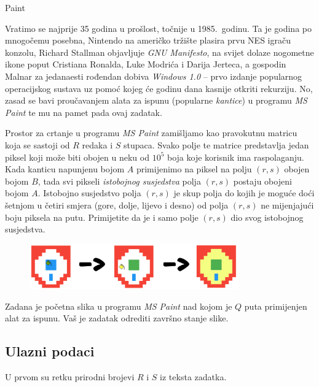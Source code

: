 \begin{statement}[
  problempoints=100,
  timelimit=1 sekunda,
  memorylimit=512 MiB,
]{Paint}

Vratimo se najprije 35 godina u prošlost, točnije u 1985.\ godinu. Ta je godina
po mnogočemu posebna, Nintendo na američko tržište plasira prvu NES igraču
konzolu, Richard Stallman objavljuje \textit{GNU Manifesto}, na svijet dolaze
nogometne ikone poput Cristiana Ronalda, Luke Modrića i Darija Jerteca, a
gospodin Malnar za jedanaesti rođendan dobiva \textit{Windows 1.0} -- prvo
izdanje popularnog operacijskog sustava uz pomoć kojeg će godinu dana kasnije
otkriti rekurziju. No, zasad se bavi proučavanjem alata za ispunu (popularne
\textit{kantice}) u programu \textit{MS Paint} te mu na pamet pada ovaj zadatak.

Prostor za crtanje u programu \textit{MS Paint} zamišljamo kao pravokutnu
matricu koja se sastoji od $R$ redaka i $S$ stupaca. Svako polje te matrice
predstavlja jedan piksel koji može biti obojen u neku od $10^5$ boja koje
korisnik ima raspolaganju. Kada kanticu napunjenu bojom $A$ primijenimo na
piksel na polju $(r, s)$ obojen bojom $B$, tada svi pikseli
\textit{istobojnog susjedstva} polja $(r, s)$ postaju obojeni bojom $A$.
Istobojno susjedstvo polja $(r, s)$ je skup polja do kojih je moguće doći
šetnjom u četiri smjera (gore, dolje, lijevo i desno) od polja $(r, s)$ ne
mijenjajući boju piksela na putu. Primijetite da je i samo polje $(r, s)$ dio
svog istobojnog susjedstva.

\begin{figure}[H]
\centering
\includegraphics[width=0.8\textwidth]{img/paint_skica.png}
\end{figure}


Zadana je početna slika u programu \textit{MS Paint} nad kojom je $Q$ puta
primijenjen alat za ispunu. Vaš je zadatak odrediti završno stanje slike.

\subsection*{Ulazni podaci}
U prvom su retku prirodni brojevi $R$ i $S$ iz teksta zadatka.


\end{statement}
